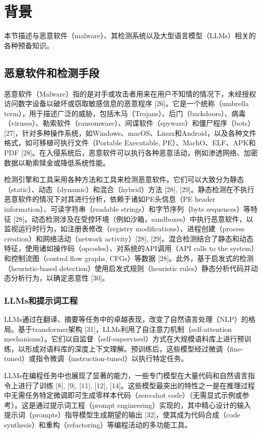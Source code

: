 
\chapter{背景}
本节描述与恶意软件（malware）、其检测系统以及大型语言模型（LLMs）相关的各种预备知识。

\section{恶意软件和检测手段}
恶意软件（Malware）指的是对手或攻击者用来在用户不知情的情况下，未经授权访问数字设备以破坏或窃取敏感信息的恶意程序 [26]。它是一个统称（umbrella term），用于描述广泛的威胁，包括木马（Trojans）、后门（backdoors）、病毒（viruses）、勒索软件（ransomware）、间谍软件（spyware）和僵尸程序（bots）[27]，针对多种操作系统，如Windows、macOS、Linux和Android，以及各种文件格式，如可移植可执行文件（Portable Executable, PE）、MachO、ELF、APK和PDF [28]。在入侵系统后，恶意软件可以执行各种恶意活动，例如渗透网络、加密数据以勒索赎金或降低系统性能。

检测引擎和工具采用各种方法和工具来检测恶意软件。它们可以大致分为静态（static）、动态（dynamic）和混合（hybrid）方法 [28], [29]。静态检测在不执行恶意软件的情况下对其进行分析，依赖于诸如PE头信息（PE header information）、可读字符串（readable strings）和字节序列（byte sequences）等特征 [28]。动态检测涉及在受控环境（例如沙箱，sandboxes）中执行恶意软件，以监视运行时行为，如注册表修改（registry modifications）、进程创建（process creation）和网络活动（network activity）[28], [29]。混合检测结合了静态和动态特征，使用诸如操作码（opcodes）、对系统的API调用（API calls to the system）和控制流图（control flow graphs, CFGs）等数据 [28]。此外，基于启发式的检测（heuristic-based detection）使用启发式规则（heuristic rules）静态分析代码并动态分析行为，以确定恶意性 [30]。

\subsection{LLMs和提示词工程}
LLMs通过在翻译、摘要等任务中的卓越表现，改变了自然语言处理（NLP）的格局。基于transformer架构 [31]，LLMs利用了自注意力机制（self-attention mechanisms）。它们以自监督（self-supervised）方式在大规模语料库上进行预训练，以形成对语料库的深度上下文理解。预训练后，这些模型经过微调（fine-tuned）或指令微调（instruction-tuned）以执行特定任务。

LLMs在编程任务中也展现了显著的能力，一些专门模型在大量代码和自然语言指令上进行了训练 [8], [9], [11], [12], [14]。这些模型最突出的特性之一是在推理过程中无需任务特定微调即可生成零样本代码（zero-shot code）（无需显式示例或参考）。这是通过提示词工程（prompt engineering）实现的，其中精心设计的输入提示词（prompts）指导模型生成期望的输出 [32]，使其成为代码合成（code synthesis）和重构（refactoring）等编程活动的多功能工具。
